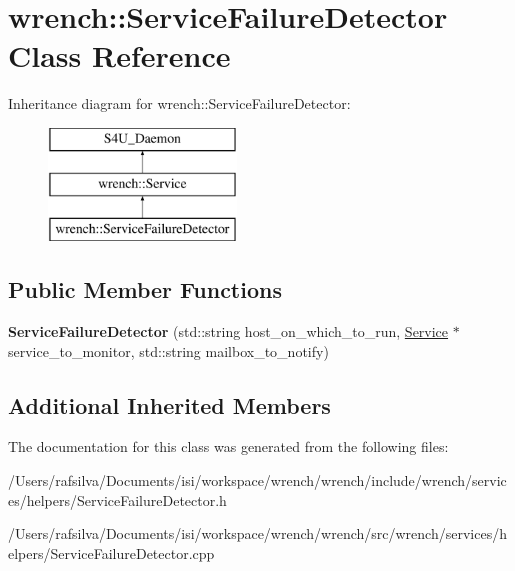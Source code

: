 \hypertarget{classwrench_1_1_service_failure_detector}{}\section{wrench\+:\+:Service\+Failure\+Detector Class Reference}
\label{classwrench_1_1_service_failure_detector}
Inheritance diagram for wrench\+:\+:Service\+Failure\+Detector\+:\begin{figure}[H]
\begin{center}
\leavevmode
\includegraphics[height=3.000000cm]{classwrench_1_1_service_failure_detector}
\end{center}
\end{figure}
\subsection*{Public Member Functions}
\begin{DoxyCompactItemize}
\item 
\mbox{\label{classwrench_1_1_service_failure_detector_a8c90fc986c6061173c1db533f3d407d1}} 
{\bfseries Service\+Failure\+Detector} (std\+::string host\+\_\+on\+\_\+which\+\_\+to\+\_\+run, \hyperlink{classwrench_1_1_service}{Service} $\ast$service\+\_\+to\+\_\+monitor, std\+::string mailbox\+\_\+to\+\_\+notify)
\end{DoxyCompactItemize}
\subsection*{Additional Inherited Members}


The documentation for this class was generated from the following files\+:\begin{DoxyCompactItemize}
\item 
/\+Users/rafsilva/\+Documents/isi/workspace/wrench/wrench/include/wrench/services/helpers/Service\+Failure\+Detector.\+h\item 
/\+Users/rafsilva/\+Documents/isi/workspace/wrench/wrench/src/wrench/services/helpers/Service\+Failure\+Detector.\+cpp\end{DoxyCompactItemize}
